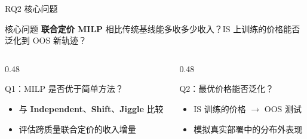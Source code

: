 \documentclass[10pt,aspectratio=169]{beamer}
\newcommand{\key}[1]{\textcolor{ZJUBlue}{\textbf{#1}}}
\begin{document}
\begin{frame}{RQ2 核心问题}
  \begin{block}{核心问题}
    \key{联合定价 MILP} 相比传统基线能多收多少收入？IS 上训练的价格能否泛化到 OOS 新轨迹？
  \end{block}
  \vspace{0.6em}
  \begin{columns}[T,onlytextwidth]
    \begin{column}{0.48\textwidth}
      \begin{block}{Q1：MILP 是否优于简单方法？}
        \begin{itemize}
          \item 与 \key{Independent}、\key{Shift}、\key{Jiggle} 比较
          \item 评估跨质量联合定价的收入增量
        \end{itemize}
      \end{block}
    \end{column}
    \begin{column}{0.48\textwidth}
      \begin{block}{Q2：最优价格能否泛化？}
        \begin{itemize}
          \item IS 训练的价格 $\rightarrow$ OOS 测试
          \item 模拟真实部署中的分布外表现
        \end{itemize}
      \end{block}
    \end{column}
  \end{columns}
\end{frame}
\end{document}
